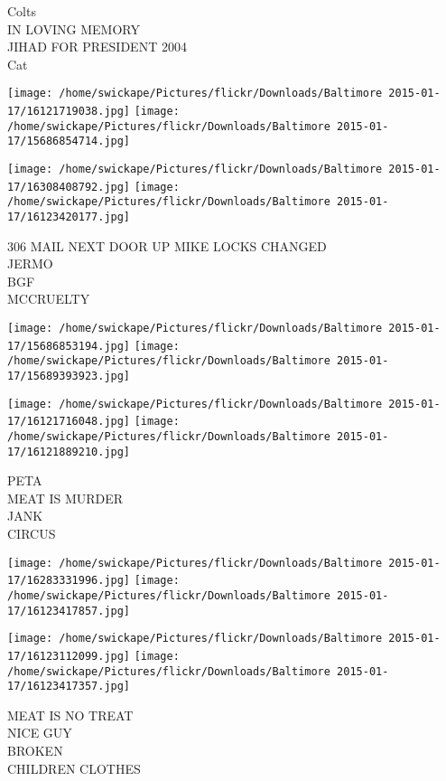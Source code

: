 \documentclass[10pt,letterpaper]{article}
\begin{document}
Colts\\
IN LOVING MEMORY\\
JIHAD FOR PRESIDENT 2004\\
Cat\\
\pagebreak

\texttt{[image: /home/swickape/Pictures/flickr/Downloads/Baltimore 2015-01-17/16121719038.jpg]}
\texttt{[image: /home/swickape/Pictures/flickr/Downloads/Baltimore 2015-01-17/15686854714.jpg]}

\texttt{[image: /home/swickape/Pictures/flickr/Downloads/Baltimore 2015-01-17/16308408792.jpg]}
\texttt{[image: /home/swickape/Pictures/flickr/Downloads/Baltimore 2015-01-17/16123420177.jpg]}

306 MAIL NEXT DOOR UP MIKE LOCKS CHANGED\\
JERMO\\
BGF\\
MCCRUELTY\\
\pagebreak

\texttt{[image: /home/swickape/Pictures/flickr/Downloads/Baltimore 2015-01-17/15686853194.jpg]}
\texttt{[image: /home/swickape/Pictures/flickr/Downloads/Baltimore 2015-01-17/15689393923.jpg]}

\texttt{[image: /home/swickape/Pictures/flickr/Downloads/Baltimore 2015-01-17/16121716048.jpg]}
\texttt{[image: /home/swickape/Pictures/flickr/Downloads/Baltimore 2015-01-17/16121889210.jpg]}

PETA\\
MEAT IS MURDER\\
JANK\\
CIRCUS\\
\pagebreak

\texttt{[image: /home/swickape/Pictures/flickr/Downloads/Baltimore 2015-01-17/16283331996.jpg]}
\texttt{[image: /home/swickape/Pictures/flickr/Downloads/Baltimore 2015-01-17/16123417857.jpg]}

\texttt{[image: /home/swickape/Pictures/flickr/Downloads/Baltimore 2015-01-17/16123112099.jpg]}
\texttt{[image: /home/swickape/Pictures/flickr/Downloads/Baltimore 2015-01-17/16123417357.jpg]}

MEAT IS NO TREAT\\
NICE GUY\\
BROKEN\\
CHILDREN CLOTHES\\
\pagebreak
\end{document}
